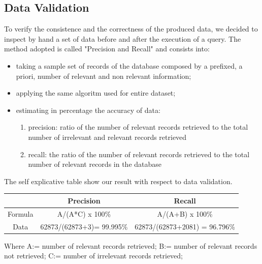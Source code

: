\documentclass[conference, onecolumn]{IEEEtran}
\begin{document}
\subsection{Data Validation}
To verify the consistence and the correctness of the produced data, we decided to inspect by hand a set of data before and after the execution of a query. The method adopted is called "Precision and Recall" and consists into:
\begin{itemize}
	\item taking a sample set of records of the database composed by a prefixed, a priori, number of relevant and non relevant information;
	\item applying the same algoritm used for entire dataset;
	\item estimating in percentage the accuracy of data:
	\begin{enumerate}
	\item precision: ratio of the number of relevant records retrieved to the total number of irrelevant and relevant records retrieved
	\item recall: the ratio of the number of relevant records retrieved to the total number of relevant records in the database
\end{enumerate}
\end{itemize}

The self explicative table show our result with respect to data validation.
\medskip

\begin{tabular}{|c|c|c|}
	\hline & Precision & Recall \\ 
	\hline Formula & A/(A*C) x 100\% & A/(A+B) x 100\% \\ 
	\hline Data & 62873/(62873+3)= 99.995\% & 62873/(62873+2081) = 96.796\% \\ 
	\hline 
\end{tabular}
\medskip

Where A:= number of relevant records retrieved; B:= number of relevant records not retrieved; C:= number of irrelevant records retrieved;
\end{document}
